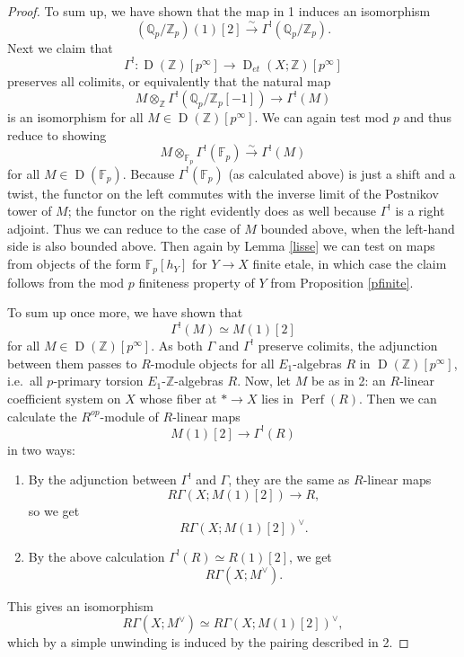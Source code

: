 \documentclass[10pt,a4paper]{amsart}
\newcommand{\mbb}{\mathbb}
\newcommand{\on}{\operatorname}
\begin{document}
\begin{proof}
To sum up, we have shown that the map in 1 induces an isomorphism
$$(\mbb{Q}_p/\mbb{Z}_p)(1)[2] \overset{\sim}{\rightarrow} \Gamma^!(\mbb{Q}_p/\mbb{Z}_p).$$
Next we claim that\
$$\Gamma^!:\on{D}(\mbb{Z})[p^\infty] \to \on{D}_{et}(X;\mbb{Z})[p^\infty]$$
preserves all colimits, or equivalently that the natural map
$$M\otimes_\mbb{Z} \Gamma^!(\mbb{Q}_p/\mbb{Z}_p[-1]) \to \Gamma^!(M)$$
is an isomorphism for all $M\in\on{D}(\mbb{Z})[p^\infty]$.  We can again test mod $p$ and thus reduce to showing
$$M\otimes_{\mbb{F}_p} \Gamma^!(\mbb{F}_p)\overset{\sim}{\rightarrow} \Gamma^!(M)$$
for all $M\in\on{D}(\mbb{F}_p)$.  Because $\Gamma^!(\mbb{F}_p)$ (as calculated above) is just a shift and a twist, the functor on the left commutes with the inverse limit of the Postnikov tower of $M$; the functor on the right evidently does as well because $\Gamma^!$ is a right adjoint.  Thus we can reduce to the case of $M$ bounded above, when the left-hand side is also bounded above.  Then again by Lemma \ref{lisse} we can test on maps from objects of the form $\mbb{F}_p[h_Y]$ for $Y\to X$ finite etale, in which case the claim follows from the mod $p$ finiteness property of $Y$ from Proposition \ref{pfinite}.

To sum up once more, we have shown that\
$$\Gamma^!(M) \simeq M(1)[2]$$
for all $M\in\on{D}(\mbb{Z})[p^\infty]$.  As both $\Gamma$ and $\Gamma^!$ preserve colimits, the adjunction between them passes to $R$-module objects for all $E_1$-algebras $R$ in $\on{D}(\mbb{Z})[p^\infty]$, i.e.\ all $p$-primary torsion $E_1$-$\mbb{Z}$-algebras $R$.  Now, let $M$ be as in 2: an $R$-linear coefficient system on $X$ whose fiber at $\ast \to X$ lies in $\on{Perf}(R)$.  Then we can calculate the $R^{op}$-module of $R$-linear maps
$$ M(1)[2] \to \Gamma^!(R)$$
 in two ways:
\begin{enumerate}
\item By the adjunction between $\Gamma^!$ and $\Gamma$, they are the same as $R$-linear maps
$$ R\Gamma(X;M(1)[2]) \to R,$$
so we get
$$R\Gamma(X;M(1)[2])^\vee.$$
\item By the above calculation $\Gamma^!(R)\simeq R(1)[2]$, we get
$$R\Gamma(X;M^\vee).$$
\end{enumerate}
This gives an isomorphism
$$R\Gamma(X;M^\vee)\simeq R\Gamma(X;M(1)[2])^\vee,$$
which by a simple unwinding is induced by the pairing described in 2.
\end{proof}
\end{document}
